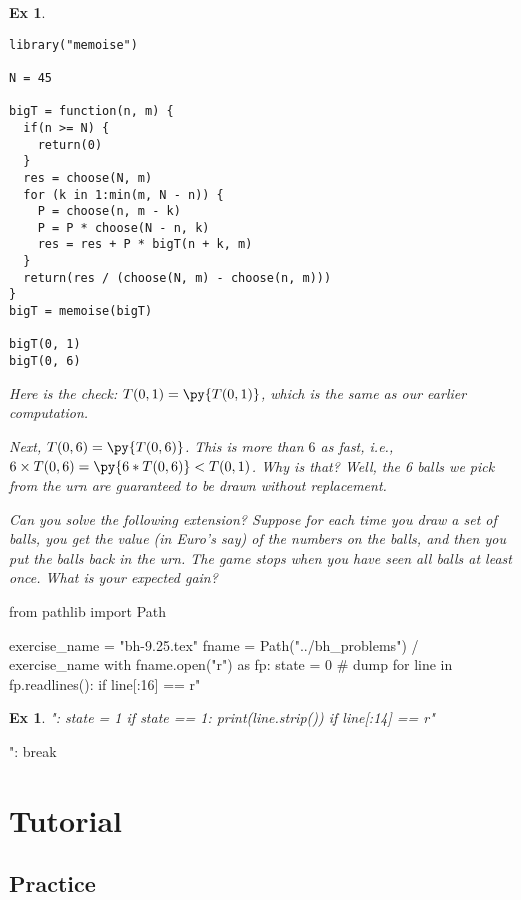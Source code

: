 \documentclass[a4paper,11pt]{article}
\newtheorem{exercise}[theorem]{Ex}
\begin{document}
\begin{exercise}
\begin{solution}
\begin{pyblock}
\end{pyblock}
\begin{verbatim}
library("memoise")

N = 45

bigT = function(n, m) {
  if(n >= N) {
    return(0)
  }
  res = choose(N, m)
  for (k in 1:min(m, N - n)) {
    P = choose(n, m - k)
    P = P * choose(N - n, k)
    res = res + P * bigT(n + k, m)
  }
  return(res / (choose(N, m) - choose(n, m)))
}
bigT = memoise(bigT)

bigT(0, 1)
bigT(0, 6)
\end{verbatim}
Here is the check: $T(0, 1) = \py{T(0, 1)}$, which is the same as our earlier computation.

Next, $T(0, 6) = \py{T(0,6)}$.
This is more than $6$ as fast, i.e., $6\times T(0, 6) = \py{6*T(0, 6)} < T(0,1)$.
Why is that?
Well, the 6 balls we pick from the urn are guaranteed to be drawn without replacement.


Can you solve the following extension? Suppose for each time you draw a set of balls, you get the value (in Euro's say) of the numbers on the balls, and then you put the balls back in the urn.
The game stops when you have seen all balls at least once. What is your expected gain?

\end{solution}
\end{exercise}


\begin{pycode}
from pathlib import Path

exercise_name = "bh-9.25.tex"
fname = Path("../bh_problems") / exercise_name
with fname.open("r") as fp:
    state = 0  # dump
    for line in fp.readlines():
        if line[:16] == r"\begin{exercise}":
            state = 1
        if state == 1:
            print(line.strip())
        if line[:14] == r"\end{exercise}":
            break
\end{pycode}


\section{Tutorial}
\label{sec:tutorial}


\subsection{Practice}
\end{document}

